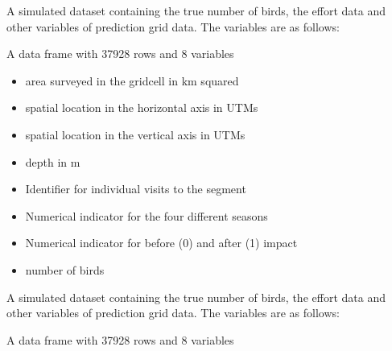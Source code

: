 \documentclass[a4paper]{book}
\begin{document}
%
\begin{Description}\relax
A simulated dataset containing the true number of birds, the effort data and other variables of 
prediction grid data. The variables are as follows:
\end{Description}
%
\begin{Format}
A data frame with 37928 rows and 8 variables
\end{Format}
%
\begin{Details}\relax
\begin{itemize}

\item {} area surveyed in the gridcell in km squared
\item {} spatial location in the horizontal axis in UTMs
\item {} spatial location in the vertical axis in UTMs
\item {} depth in m
\item {} Identifier for individual visits to the segment
\item {} Numerical indicator for the four different seasons
\item {} Numerical indicator for before (0) and after (1) impact
\item {} number of birds

\end{itemize}

\end{Details}
%
\begin{Description}\relax
A simulated dataset containing the true number of birds, the effort data and other variables of 
prediction grid data. The variables are as follows:
\end{Description}
%
\begin{Format}
A data frame with 37928 rows and 8 variables
\end{Format}
%
\end{document}
